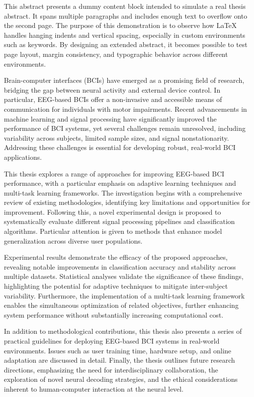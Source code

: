 This abstract presents a dummy content block intended to simulate a real thesis abstract. It spans multiple paragraphs and includes enough text to overflow onto the second page. The purpose of this demonstration is to observe how {\LaTeX} handles hanging indents and vertical spacing, especially in custom environments such as keywords. By designing an extended abstract, it becomes possible to test page layout, margin consistency, and typographic behavior across different environments.

Brain-computer interfaces (BCIs) have emerged as a promising field of research, bridging the gap between neural activity and external device control. In particular, EEG-based BCIs offer a non-invasive and accessible means of communication for individuals with motor impairments. Recent advancements in machine learning and signal processing have significantly improved the performance of BCI systems, yet several challenges remain unresolved, including variability across subjects, limited sample sizes, and signal nonstationarity. Addressing these challenges is essential for developing robust, real-world BCI applications.

This thesis explores a range of approaches for improving EEG-based BCI performance, with a particular emphasis on adaptive learning techniques and multi-task learning frameworks. The investigation begins with a comprehensive review of existing methodologies, identifying key limitations and opportunities for improvement. Following this, a novel experimental design is proposed to systematically evaluate different signal processing pipelines and classification algorithms. Particular attention is given to methods that enhance model generalization across diverse user populations.

Experimental results demonstrate the efficacy of the proposed approaches, revealing notable improvements in classification accuracy and stability across multiple datasets. Statistical analyses validate the significance of these findings, highlighting the potential for adaptive techniques to mitigate inter-subject variability. Furthermore, the implementation of a multi-task learning framework enables the simultaneous optimization of related objectives, further enhancing system performance without substantially increasing computational cost.

In addition to methodological contributions, this thesis also presents a series of practical guidelines for deploying EEG-based BCI systems in real-world environments. Issues such as user training time, hardware setup, and online adaptation are discussed in detail. Finally, the thesis outlines future research directions, emphasizing the need for interdisciplinary collaboration, the exploration of novel neural decoding strategies, and the ethical considerations inherent to human-computer interaction at the neural level.

